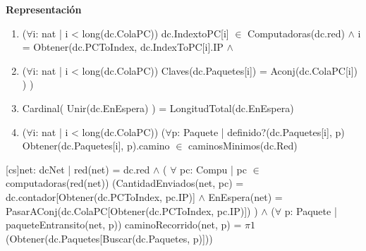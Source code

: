 \documentclass[a4paper,10pt]{article}
\newenvironment{Representacion}{%
  \vspace*{2ex}%
  \noindent\textbf{\Large Representación}%
  \vspace*{2ex}%
}{}
\begin{document}
\begin{Representacion}
{\begin{enumerate}
  \item ($\forall$i: nat | i < long(dc.ColaPC)) dc.IndextoPC[i] $\in$ Computadoras(dc.red) $\wedge$ i = Obtener(dc.PCToIndex, dc.IndexToPC[i].IP $\wedge$ 
  \item ($\forall$i: nat | i < long(dc.ColaPC)) Claves(dc.Paquetes[i]) = Aconj(dc.ColaPC[i]) ) )
  \item Cardinal( Unir(dc.EnEspera) ) = LongitudTotal(dc.EnEspera)
  \item ($\forall$i: nat | i < long(dc.ColaPC))  ($\forall$p: Paquete | definido?(dc.Paquetes[i], p) Obtener(dc.Paquetes[i], p).camino $\in$ caminosMinimos(dc.Red)
  \end{enumerate}
  }\mbox{}
  
  
  
  
  
  \BlankLine 	 
  
  [cs]{net: dcNet | red(net) = dc.red $\wedge$ ( $\forall$  pc: Compu | pc $\in$ computadoras(red(net)) (CantidadEnviados(net, pc) = dc.contador[Obtener(dc.PCToIndex, pc.IP)] $\wedge$ EnEspera(net) = PasarAConj(dc.ColaPC[Obtener(dc.PCToIndex, pc.IP)]) ) $\wedge$ ($\forall$ p: Paquete | paqueteEntransito(net, p)) caminoRecorrido(net, p) = $\pi1$(Obtener(dc.Paquetes[Buscar(dc.Paquetes, p)])) }
  
  \BlankLine
  \BlankLine
  
  
  

 
  
 	 
  \BlankLine
  
  
\end{Representacion}
\end{document}
